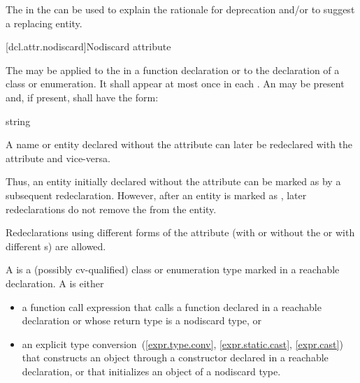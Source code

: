 \documentclass{wg21}
\begin{document}
\begin{note}
    The  in the 
    can be used to explain the rationale for deprecation and/or to suggest a replacing entity.
\end{note}

[dcl.attr.nodiscard]{Nodiscard attribute}%

\pnum
The  
may be applied to the 
in a function declaration or to the declaration of a class or enumeration.
It shall appear at most once in each .
An  may be present
and, if present, shall have the form:

\begin{ncbnf}
    \terminal{(} string \terminal{)}
\end{ncbnf}

\pnum
A name or entity declared without the  attribute
can later be redeclared with the attribute and vice-versa.
\begin{note}
    Thus, an entity initially declared without the attribute
    can be marked as 
    by a subsequent redeclaration.
    However, after an entity is marked as ,
    later redeclarations do not remove the 
    from the entity.
\end{note}
Redeclarations using different forms of the attribute
(with or without the 
or with different s)
are allowed.

\pnum
A  is
a (possibly cv-qualified) class or enumeration type
marked  in a reachable declaration.
A  is either
\begin{itemize}
    \item
    a function call expression
    that calls a function declared  in a reachable declaration or
    whose return type is a nodiscard type, or
    \item
    an explicit type
    conversion~(\ref{expr.type.conv}, \ref{expr.static.cast}, \ref{expr.cast})
    that constructs an object through
    a constructor declared  in a reachable declaration, or
    that initializes an object of a nodiscard type.
\end{itemize}
\end{document}
